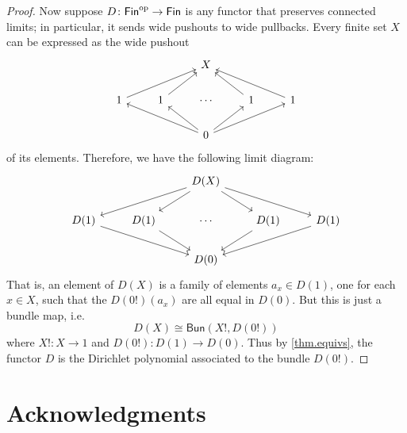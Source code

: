 \documentclass[11pt, article, one side]{memoir}
\theoremstyle{theorem}
\theoremstyle{definition}
\theoremstyle{remark}
\newcommand{\Cat}[1]{\mathsf{#1}}%
\newcommand{\op}{^\tn{op}}
\newcommand{\tn}[1]{\textnormal{#1}}
\newcommand{\fin}{\Cat{Fin}}
\newcommand{\bun}{\Cat{Bun}}
\begin{document}
\begin{proof}
Now suppose $D\colon\fin\op\to\fin$ is any functor that preserves connected limits; in particular, it sends wide pushouts to wide pullbacks. Every finite set $X$ can be expressed as the wide pushout
\[
\begin{tikzcd}
              &              & X                                               &              &               \\
1 \arrow[rru] & 1 \arrow[ru] & \cdots                                          & 1 \arrow[lu] & 1 \arrow[llu] \\
              &              & 0 \arrow[llu] \arrow[lu] \arrow[ru] \arrow[rru] &              &              
\end{tikzcd}
\]
of its elements. Therefore, we have the following limit diagram:
\[
\begin{tikzcd}
                 &                 & D(X) \arrow[lld] \arrow[ld] \arrow[rd] \arrow[rrd] &                 &                  \\
D(1) \arrow[rrd] & D(1) \arrow[rd] & \cdots                                             & D(1) \arrow[ld] & D(1) \arrow[lld] \\
                 &                 & D(0)                                               &                 &                 
\end{tikzcd}
\]
That is, an element of $D(X)$ is a family of elements $a_x \in D(1)$, one for each $x \in X$, such that the $D(0!)(a_x)$ are all equal in $D(0)$. But this is just a bundle map, i.e.
\[D(X) \cong \bun(X!, D(0!))\]
where $X!\colon X\to 1$ and $D(0!)\colon D(1)\to D(0)$. Thus by \cref{thm.equivs}, the functor $D$ is the Dirichlet polynomial associated to the bundle $D(0!)$.
\end{proof}



\section*{Acknowledgments}
\end{document}
